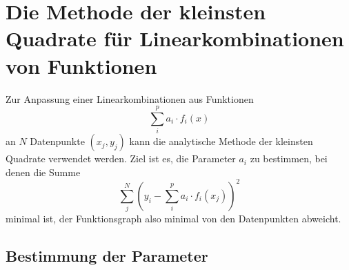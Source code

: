 \documentclass{scrartcl}
\begin{document}
\section*{Die Methode der kleinsten Quadrate für Linearkombinationen von Funktionen}

Zur Anpassung einer Linearkombinationen aus Funktionen 
\begin{equation}
    \sum_i^p a_i \cdot f_i(x)
\end{equation}
an $N$ Datenpunkte $(x_j, y_j)$ kann die analytische Methode der kleinsten Quadrate verwendet werden. 
Ziel ist es, die Parameter $a_i$ zu bestimmen, bei denen die Summe
\begin{equation}
    \sum_j^N\left( y_i - \sum_i^p a_i\cdot f_i(x_j)\right)^2
\end{equation}
minimal ist, der Funktionsgraph also minimal von den Datenpunkten abweicht.
\subsection*{Bestimmung der Parameter}
\end{document}
